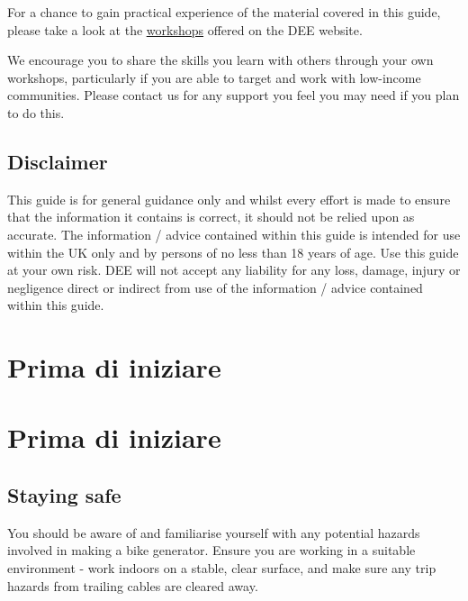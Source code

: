 \documentclass{article}
\theoremstyle{definition}
\theoremstyle{definition}
\theoremstyle{remark}
\begin{document}
    For a chance to gain practical experience of the material covered in this guide, please take a look at the \href{https://www.demandenergyequality.org/our-workshops/}{\underline{workshops}} offered on the DEE website.

    We encourage you to share the skills you learn with others through your own workshops, particularly if you are able to target and work with low-income communities. Please contact us for any support you feel you may need if you plan to do this.


  {\color{blue}\subsection{Disclaimer}} %
  \label{sub:disclaimer}

    This guide is for general guidance only and whilst every effort is made to ensure that the information it contains is correct, it should not be relied upon as accurate. The information / advice contained within this guide is intended for use within the UK only and by persons of no less than 18 years of age. Use this guide at your own risk. DEE will not accept any liability for any loss, damage, injury or negligence direct or indirect from use of the information / advice contained within this guide.


  \newpage  


\section{Prima di iniziare} %
\label{sec:prima_di_iniziare}


{\color{blue}\section{Prima di iniziare}} %
\label{sec:prima_di_iniziare}

  {\color{blue}\subsection{Staying safe}} %
  \label{sub:staying_safe}

    You should be aware of and familiarise yourself with any potential hazards involved in making a bike generator. Ensure you are working in a suitable environment - work indoors on a stable, clear surface, and make sure any trip hazards from trailing cables are cleared away. 
\end{document}
